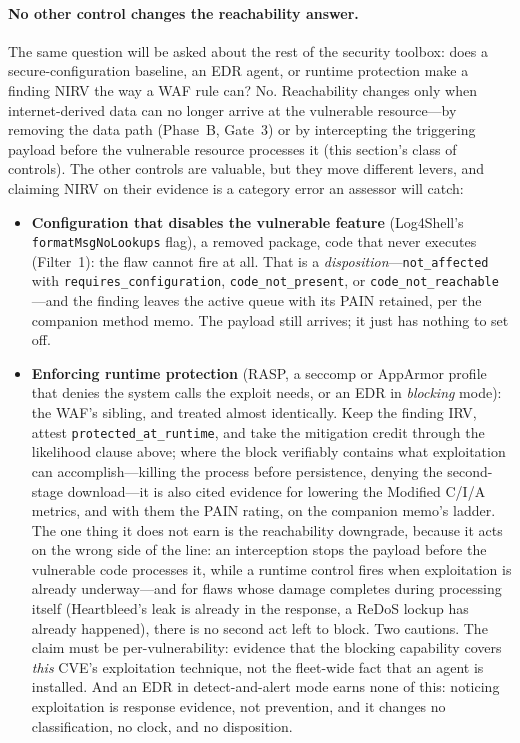 \documentclass[11pt]{article}
\newcommand{\code}[1]{\texttt{#1}}
\begin{document}
\paragraph{No other control changes the reachability answer.} The same question will be asked about the rest of the security toolbox: does a secure-configuration baseline, an EDR agent, or runtime protection make a finding NIRV the way a WAF rule can? No. Reachability changes only when internet-derived data can no longer arrive at the vulnerable resource---by removing the data path (Phase~B, Gate~3) or by intercepting the triggering payload before the vulnerable resource processes it (this section's class of controls). The other controls are valuable, but they move different levers, and claiming NIRV on their evidence is a category error an assessor will catch:
\begin{itemize}[leftmargin=1.5em, nosep]
\item \textbf{Configuration that disables the vulnerable feature} (Log4Shell's \code{formatMsgNoLookups} flag), a removed package, code that never executes (Filter~1): the flaw cannot fire at all. That is a \emph{disposition}---\code{not\_affected} with \code{requires\_configuration}, \code{code\_not\_present}, or \code{code\_not\_reachable}---and the finding leaves the active queue with its PAIN retained, per the companion method memo. The payload still arrives; it just has nothing to set off.
\item \textbf{Enforcing runtime protection} (RASP, a seccomp or AppArmor profile that denies the system calls the exploit needs, or an EDR in \emph{blocking} mode): the WAF's sibling, and treated almost identically. Keep the finding IRV, attest \code{protected\_at\_runtime}, and take the mitigation credit through the likelihood clause above; where the block verifiably contains what exploitation can accomplish---killing the process before persistence, denying the second-stage download---it is also cited evidence for lowering the Modified C/I/A metrics, and with them the PAIN rating, on the companion memo's ladder. The one thing it does not earn is the reachability downgrade, because it acts on the wrong side of the line: an interception stops the payload before the vulnerable code processes it, while a runtime control fires when exploitation is already underway---and for flaws whose damage completes during processing itself (Heartbleed's leak is already in the response, a ReDoS lockup has already happened), there is no second act left to block. Two cautions. The claim must be per-vulnerability: evidence that the blocking capability covers \emph{this} CVE's exploitation technique, not the fleet-wide fact that an agent is installed. And an EDR in detect-and-alert mode earns none of this: noticing exploitation is response evidence, not prevention, and it changes no classification, no clock, and no disposition.

\end{itemize}
\end{document}
